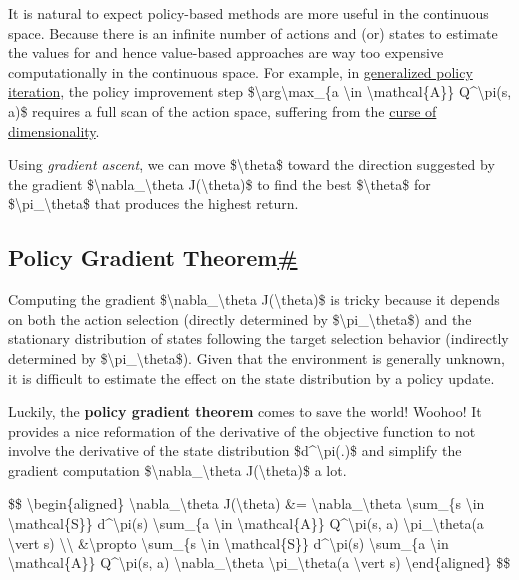 It is natural to expect policy-based methods are more useful in the continuous space. Because there is an infinite number of actions and (or) states to estimate the values for and hence value-based approaches are way too expensive computationally in the continuous space. For example, in \href{https://lilianweng.github.io/posts/2018-02-19-rl-overview/\#policy-iteration}{generalized policy iteration}, the policy improvement step \$\textbackslash arg\textbackslash max\_\{a \textbackslash in \textbackslash mathcal\{A\}\} Q\^{}\textbackslash pi(s, a)\$ requires a full scan of the action space, suffering from the \href{https://en.wikipedia.org/wiki/Curse_of_dimensionality}{curse of dimensionality}.

Using \emph{gradient ascent}, we can move \$\textbackslash theta\$ toward the direction suggested by the gradient \$\textbackslash nabla\_\textbackslash theta J(\textbackslash theta)\$ to find the best \$\textbackslash theta\$ for \$\textbackslash pi\_\textbackslash theta\$ that produces the highest return.

\subsection{\texorpdfstring{Policy Gradient Theorem\hyperref[policy-gradient-theorem]{\#}}{Policy Gradient Theorem\#}}\label{policy-gradient-theorem}

Computing the gradient \$\textbackslash nabla\_\textbackslash theta J(\textbackslash theta)\$ is tricky because it depends on both the action selection (directly determined by \$\textbackslash pi\_\textbackslash theta\$) and the stationary distribution of states following the target selection behavior (indirectly determined by \$\textbackslash pi\_\textbackslash theta\$). Given that the environment is generally unknown, it is difficult to estimate the effect on the state distribution by a policy update.

Luckily, the \textbf{policy gradient theorem} comes to save the world! Woohoo! It provides a nice reformation of the derivative of the objective function to not involve the derivative of the state distribution \$d\^{}\textbackslash pi(.)\$ and simplify the gradient computation \$\textbackslash nabla\_\textbackslash theta J(\textbackslash theta)\$ a lot.

\$\$ \textbackslash begin\{aligned\} \textbackslash nabla\_\textbackslash theta J(\textbackslash theta) \&= \textbackslash nabla\_\textbackslash theta \textbackslash sum\_\{s \textbackslash in \textbackslash mathcal\{S\}\} d\^{}\textbackslash pi(s) \textbackslash sum\_\{a \textbackslash in \textbackslash mathcal\{A\}\} Q\^{}\textbackslash pi(s, a) \textbackslash pi\_\textbackslash theta(a \textbackslash vert s) \textbackslash\textbackslash{} \&\textbackslash propto \textbackslash sum\_\{s \textbackslash in \textbackslash mathcal\{S\}\} d\^{}\textbackslash pi(s) \textbackslash sum\_\{a \textbackslash in \textbackslash mathcal\{A\}\} Q\^{}\textbackslash pi(s, a) \textbackslash nabla\_\textbackslash theta \textbackslash pi\_\textbackslash theta(a \textbackslash vert s) \textbackslash end\{aligned\} \$\$

